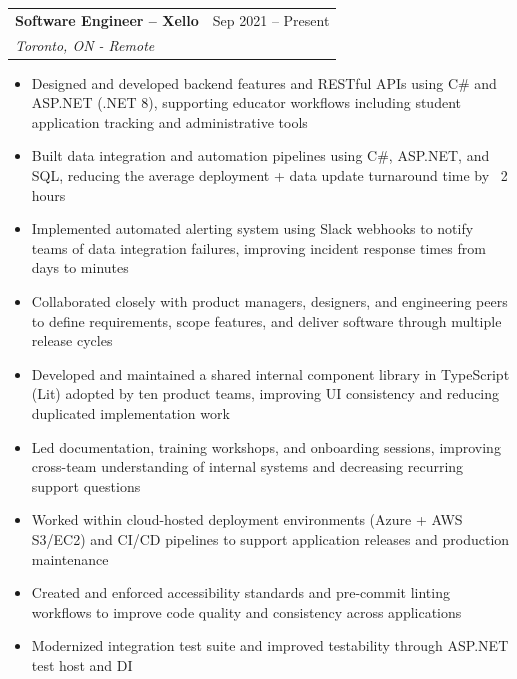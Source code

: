 \documentclass[letterpaper,11pt]{article}
\makeatletter
\newcommand{\resumeItem}[1]{
  \item\small{
    {#1 \vspace{-2pt}}
  }
}
\newcommand{\resumeSubheading}[4]{
  \vspace{-2pt}\item
    \begin{tabular*}{0.97\textwidth}[t]{l@{\extracolsep{\fill}}r}
      \textbf{#1} & #2 \\
      \textit{\small#3} & \textit{\small #4} \\
    \end{tabular*}\vspace{-7pt}
}
\newcommand{\resumeSubSubheading}[2]{
    \item
    \begin{tabular*}{0.97\textwidth}{l@{\extracolsep{\fill}}r}
      \textit{\small#1} & \textit{\small #2} \\
    \end{tabular*}\vspace{-7pt}
}
\newcommand{\resumeSubHeadingListEnd}{\end{itemize}}
\newcommand{\resumeItemListStart}{\begin{itemize}}
\newcommand{\resumeItemListEnd}{\end{itemize}\vspace{-5pt}}
\makeatother
\begin{document}
    \resumeSubheading
      {Software Engineer -- Xello}{Sep 2021 -- Present}
      {Toronto, ON - Remote}{}
      \resumeItemListStart
        \resumeItem{Designed and developed backend features and RESTful APIs using C\# and ASP.NET (.NET 8), supporting educator workflows including student application tracking and administrative tools}
        \resumeItem{Built data integration and automation pipelines using C\#, ASP.NET, and SQL, reducing the average deployment + data update turnaround time by ~2 hours}
        \resumeItem{Implemented automated alerting system using Slack webhooks to notify teams of data integration failures, improving incident response times from days to minutes}
        \resumeItem{Collaborated closely with product managers, designers, and engineering peers to define requirements, scope features, and deliver software through multiple release cycles}
        \resumeItem{Developed and maintained a shared internal component library in TypeScript (Lit) adopted by ten product teams, improving UI consistency and reducing duplicated implementation work}
        \resumeItem{Led documentation, training workshops, and onboarding sessions, improving cross-team understanding of internal systems and decreasing recurring support questions}
        \resumeItem{Worked within cloud-hosted deployment environments (Azure + AWS S3/EC2) and CI/CD pipelines to support application releases and production maintenance}
        \resumeItem{Created and enforced accessibility standards and pre-commit linting workflows to improve code quality and consistency across applications}
        \resumeItem{Modernized integration test suite and improved testability through ASP.NET test host and DI}
      \resumeItemListEnd


\end{document}
